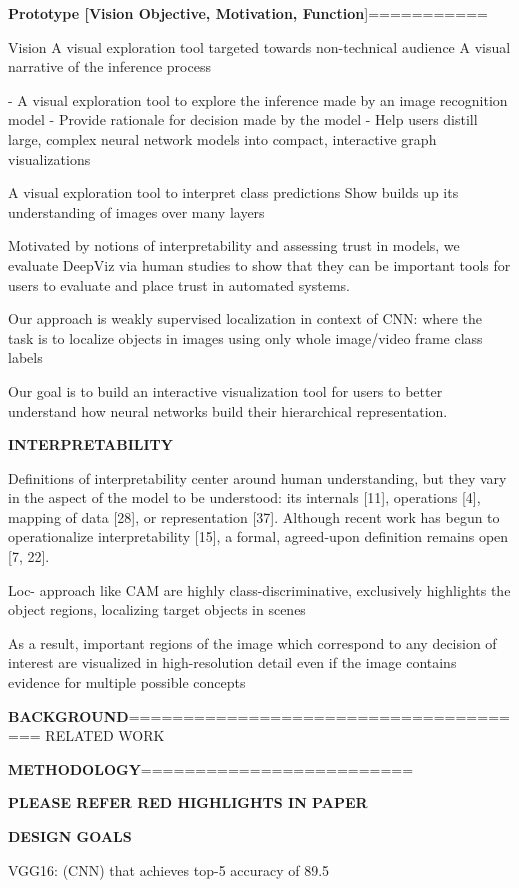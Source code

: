 \textbf{Prototype [Vision Objective, Motivation, Function}]===========

Vision
A visual exploration tool targeted towards non-technical audience
A visual narrative of the inference process

- A visual exploration tool to explore the inference made by an image recognition model
- Provide rationale for decision made by the model
- Help users distill large, complex neural network models into compact, interactive graph visualizations

A visual exploration tool to interpret class predictions
Show builds up its understanding of images over many layers

Motivated by notions of interpretability and assessing trust in models, we evaluate DeepViz via human studies to show that they can be important tools for users to evaluate and place trust in automated systems.

Our approach is weakly supervised localization in context of CNN: where the task is to localize objects in images using only whole image/video frame class labels

Our goal is to build an interactive visualization tool for users to better
understand how neural networks build their hierarchical representation.

\textbf{INTERPRETABILITY}

Definitions of interpretability center around human understanding, but they vary in the aspect of the model to be understood: its internals [11], operations [4], mapping of data [28], or representation [37]. Although recent work has begun to operationalize interpretability [15], a formal, agreed-upon definition remains open [7, 22].


Loc- approach like CAM are highly class-discriminative, exclusively highlights the object regions, localizing target objects in scenes

As a result, important regions of the image which correspond
to any decision of interest are visualized in high-resolution
detail even if the image contains evidence for multiple possible concepts

\textbf{BACKGROUND}======================================
RELATED WORK

\textbf{METHODOLOGY}=========================

\textbf{PLEASE REFER RED HIGHLIGHTS IN PAPER}

\textbf{DESIGN GOALS}

VGG16: (CNN) that achieves top-5 accuracy of 89.5%

